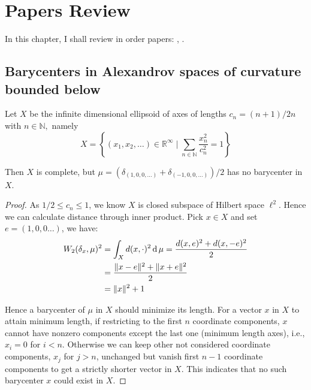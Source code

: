 \chapter{Papers Review}
In this chapter, I shall review in order papers: \cite{ohta2012barycenters}, \cite{le2017existence}.
\section{Barycenters in Alexandrov spaces of curvature bounded below}
\begin{prop}[Example 3.1 a]
	Let \( X \) be the infinite dimensional ellipsoid of axes of lengths \( c _ { n } = ( n + 1 ) / 2 n \) with \( n \in \mathbb { N } , \) namely \[ X = \left\{ \left( x _ { 1 } , x _ { 2 } , \ldots \right) \in \mathbb { R } ^ { \infty } \mid \sum _ { n \in \mathbb { N } } \frac { x _ { n } ^ { 2 } } { c _ { n } ^ { 2 } } = 1 \right\} \]

	Then \( X \) is complete, but \( \mu = \left( \delta _ { ( 1,0,0 , \ldots ) } + \delta _ { ( - 1,0,0 , \ldots ) } \right) / 2 \) has no barycenter in \( X \).
\end{prop}

\begin{proof}
	As $ 1 / 2 \leq c_{n} \leq 1$, we know $X$ is closed subspace of Hilbert space $\ell^2$. Hence we can calculate distance through inner product. Pick $ x \in X$ and set $ e=(1,0,0\ldots)$, we have:
	\begin{align*}
		W_2(\delta_x, \mu)^2 & = \int_{X} d(x, \cdot)^2 \operatorname{d} \mu = \frac{d(x,e)^2+d(x,-e)^2 }{2} \\
		                     & =\frac{\Vert x - e \Vert^2 + \Vert x + e \Vert^2}{2}               \\
		                     & =\Vert x \Vert^2 + 1
	\end{align*}

	Hence a barycenter of $\mu$ in $X$ should minimize its length. For a vector $x$ in $X$ to attain minimum length, if restricting to the first $n$ coordinate components, $x$ cannot have nonzero components except the last one (minimum length axes), i.e., $x_i =0$ for $i<n$. Otherwise we can keep other not considered coordinate components, $x_j$ for $j>n$,  unchanged but vanish first $n-1$ coordinate components to get a strictly shorter vector in $X$. This indicates that no such barycenter $x$ could exist in $X$.
\end{proof}

